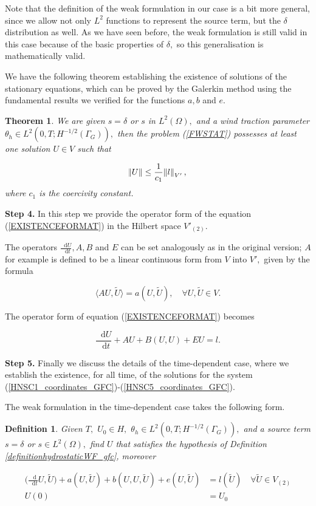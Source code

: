 \documentclass[12pt]{report}
\newtheorem{theorem}{Theorem}
\numberwithin{theorem}{chapter}
\numberwithin{corollary}{chapter}
\numberwithin{lemma}{chapter}
\numberwithin{remark}{chapter}
\newtheorem{definition}{Definition}
\numberwithin{definition}{chapter}
\numberwithin{prop}{chapter}
\newcommand*\diff{\mathop{}\!\mathrm{d}}
\begin{document}
Note that the definition of the weak formulation in our case is a bit more general, since we allow not only $L^2$ functions to represent the source term, but the $\delta$ distribution as well. As we have seen before, the weak formulation is still valid in this case because of the basic properties of $\delta,$ so this generalisation is mathematically valid. 

We have the following theorem establishing the existence of solutions of the stationary equations, which can be proved by the Galerkin method using the fundamental results we verified for the functions $a,b$ and $e$.

\begin{theorem}
We are given $s = \delta$ or $s$ in $L^2(\Omega),$ and a wind traction parameter $\theta_h \in L^2(0,T;H^{-1/2}(\Gamma_G)),$ then the problem (\ref{FWSTAT}) possesses at least one solution $U \in V$ such that

\[ \norm{U} \leq \frac{1}{c_1} \norm{l}_{V'},\] where $c_1$ is the coercivity constant.

\end{theorem}

\textbf{Step 4.} In this step we provide the operator form of the equation (\ref{EXISTENCEFORMAT}) in the Hilbert space $V'_{(2)}$.

The operators $ \frac{\diff U}{\diff t}, A, B$ and $E$ can be set analogously as in the original version; $A$ for example is defined to be a linear continuous form from $V$ into $V',$ given by the formula

\[ \langle AU, \tilde{U} \rangle =a(U, \tilde{U}), \quad \forall U, \tilde{U} \in V.\]

The operator form of equation (\ref{EXISTENCEFORMAT}) becomes

\[ \frac{\diff U}{\diff t} + AU + B(U,U) + EU = l.\]

\textbf{Step 5.} Finally we discuss the details of the time-dependent case, where we establish the existence, for all time, of the solutions for the system (\ref{HNSC1_coordinates_GFC})-(\ref{HNSC5_coordinates_GFC}).

The weak formulation in the time-dependent case takes the following form.

\begin{definition}

Given $T,$ $U_0 \in H,$ $\theta_h \in L^2(0,T;H^{-1/2}(\Gamma_G)),$ and a source term $s = \delta$ or $s \in L^2(\Omega),$ find $U$ that satisfies the hypothesis of Definition \ref{definitionhydrostaticWF_gfc}, moreover

\begin{equation} \label{timedependentWFE}
  \begin{split}
   \bigg ( \frac{\diff}{\diff t} U, \tilde{U} \bigg ) + a(U, \tilde{U}) + b(U,U, \tilde{U})+ e(U, \tilde{U})  & = l(\tilde{U}) \quad \forall \tilde{U} \in V_{(2)} \\
    U(0) &= U_0
 \end{split}
\end{equation}

\end{definition}
\end{document}
